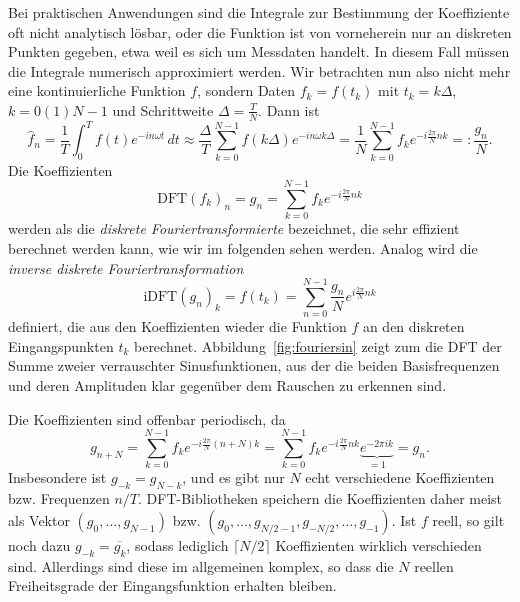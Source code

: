 Bei praktischen Anwendungen sind die Integrale zur Bestimmung der
Koeffiziente oft nicht analytisch lösbar, oder die Funktion ist von
vorneherein nur an diskreten Punkten gegeben, etwa weil es sich um
Messdaten handelt. In diesem Fall müssen die Integrale numerisch
approximiert werden. Wir betrachten nun also nicht mehr eine
kontinuierliche Funktion $f$, sondern Daten $f_k = f(t_k)$ mit
$t_k=k\Delta$, $k=0(1)N-1$ und Schrittweite $\Delta =
\frac{T}{N}$. Dann ist
\begin{equation}
  \hat{f}_n = \frac{1}{T}\int_0^T f(t)e^{-i n\omega t}\, dt
  \approx
  \frac{\Delta}{T}\sum_{k=0}^{N-1} f(k\Delta) e^{-i n\omega k\Delta}
  =
  \frac{1}{N}\sum_{k=0}^{N-1} f_k e^{-i\frac{2\pi}{N} n k} =: \frac{g_n}{N}.
\end{equation}
Die Koeffizienten
\begin{equation}
  \label{eq:dft}
  \text{DFT}(f_k)_n = g_n = \sum_{k=0}^{N-1} f_k e^{-i \frac{2\pi}{N} n k}
\end{equation}
werden als die \emph{diskrete Fouriertransformierte} bezeichnet, die
sehr effizient berechnet werden kann, wie wir im folgenden sehen
werden. Analog wird die \emph{inverse diskrete Fouriertransformation}
\begin{equation}
  \label{eq:idft}
  \text{iDFT}(g_n)_k = f(t_k) = \sum_{n=0}^{N-1} \frac{g_n}{N} e^{i \frac{2\pi}{N} n k}
\end{equation}
definiert, die aus den Koeffizienten wieder die Funktion $f$ an den
diskreten Eingangspunkten $t_k$
berechnet. Abbildung~\ref{fig:fouriersin} zeigt zum die DFT der Summe
zweier verrauschter Sinusfunktionen, aus der die beiden
Basisfrequenzen und deren Amplituden klar gegenüber dem Rauschen zu
erkennen sind.

Die Koeffizienten sind offenbar periodisch, da
\begin{equation}
  \label{eq:dftper}
  g_{n+N} = \sum_{k=0}^{N-1} f_k e^{-i\frac{2\pi}{N} (n + N) k} =
  \sum_{k=0}^{N-1} f_k e^{-i\frac{2\pi}{N} n k} \underbrace{e^{-2\pi i k}}_{=1} = g_n.
\end{equation}
Insbesondere ist $g_{-k} = g_{N-k}$, und es gibt nur $N$ echt
verschiedene Koeffizienten bzw. Frequenzen $n/T$. DFT-Bibliotheken
speichern die Koeffizienten daher meist als Vektor
$(g_{0},\ldots,g_{N-1})$
bzw. $(g_{0},\ldots,g_{N/2-1},g_{-N/2},\ldots,g_{-1})$.  Ist $f$
reell, so gilt noch dazu $g_{-k} = \overline{g_{k}}$, sodass lediglich
$\lceil N/2\rceil$ Koeffizienten wirklich verschieden sind. Allerdings
sind diese im allgemeinen komplex, so dass die $N$ reellen
Freiheitsgrade der Eingangsfunktion erhalten bleiben.

